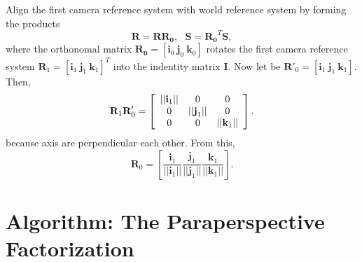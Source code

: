 Align the first camera reference system with world reference system by forming the products
\begin{equation}
 \mathbf{R} = \mathbf{R}\mathbf{R_0}, \ \ \ \mathbf{S} = \mathbf{R_0}^T \mathbf{S}, 
 \label{cameranorm}
 \end{equation}
where the orthonomal matrix $ \mathbf{R_0} = [\mathbf{i}_0 \  \mathbf{j}_0 \ \mathbf{k}_0] $ rotates the first camera reference system $ \textbf{R}_1 = [ \textbf{i}_1 \ \textbf{j}_1 \ \textbf{k}_1 ]^T $ into the indentity matrix $ \textbf{I} $. Now let be $ \mathbf{R}'_0 = [\mathbf{i}_1 \  \mathbf{j}_1 \ \mathbf{k}_1] $. 
Then, 
$$ \textbf{R}_1 \textbf{R}'_0 = \left[ \begin{array}{c c c}
|| \textbf{i}_1 || & 0 & 0 \\
0 & || \textbf{j}_1 || & 0 \\
0 & 0 & || \textbf{k}_1 || 
\end{array} \right]. $$
because axis are perpendicular each other. From this, 
$$ \textbf{R}_0 = \left[ \frac{\textbf{i}_1}{|| \textbf{i}_1 || }  \frac{\textbf{j}_1}{|| \textbf{j}_1 || } \frac{\textbf{k}_1}{|| \textbf{k}_1 || } \right] . $$

\chapter{Algorithm: The Paraperspective Factorization}

